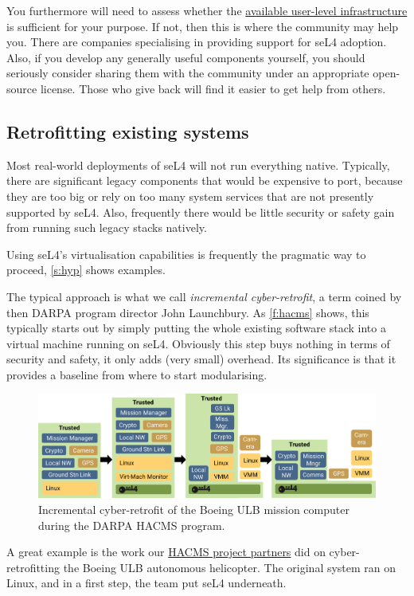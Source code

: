 \documentclass[english,a4paper,12pt]{report}
\newcommand{\SSect}[1]{\subsection{#1}}
\newcommand{\SSect}[1]{\section{#1}}
\begin{document}
  You furthermore will need to assess whether the
  \href{https://docs.sel4.systems/projects/available-user-components.html}{available
    user-level infrastructure} is sufficient for your purpose. If not,
  then this is where the community may help you. There are companies
  specialising in providing support for seL4 adoption. Also, if you
  develop any generally useful components yourself, you should
  seriously consider sharing them with the community under an
  appropriate open-source license. Those who give back will find it
  easier to get help from others.

  \SSect{Retrofitting existing systems}

  Most real-world deployments of seL4 will not run everything
  native. Typically, there are significant legacy components that would
  be expensive to port, because they are too big or rely on too many
  system services that are not presently supported by seL4. Also,
  frequently there would be little security or safety gain from
  running such legacy stacks natively.

  Using seL4's virtualisation capabilities is frequently the pragmatic
  way to proceed, \autoref{s:hyp} shows examples.

  The typical approach is what we call \emph{incremental
    cyber-retrofit}, a term coined by then DARPA program director John
  Launchbury. As \autoref{f:hacms} shows, this typically starts out by simply putting the whole existing
  software stack into a virtual machine running on seL4. Obviously
  this step buys nothing in terms of security and safety, it only adds
  (very small) overhead. Its significance is that it provides a
  baseline from where to start modularising.

  \begin{figure}[tb]
    \centering
    \includegraphics{hacms}
    \caption[Incremental cyber-retrofit on the ULB.]{Incremental
      cyber-retrofit of the Boeing ULB mission computer during the
      DARPA HACMS program.}
    \label{f:hacms}
  \end{figure}

  A great example is the work our \href{https://trustworthy.systems/projects/TS/SMACCM/}{HACMS project partners} did on cyber-retrofitting the Boeing
  ULB autonomous helicopter. The original system ran on Linux, and in
  a first step, the team put seL4 underneath.
\end{document}
